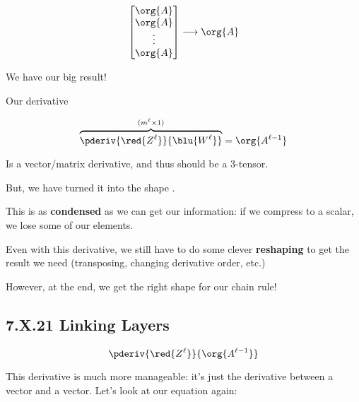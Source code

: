         \begin{equation}
            \begin{bmatrix}
                \org{A} \\ \org{A} \\ \vdots \\ \org{A} 
            \end{bmatrix}
            \longrightarrow
            \org{A}
        \end{equation}
        
        We have our big result!\\
        
        \begin{notation}
            Our derivative
            
            \begin{equation*}
                \overbrace{
                    \pderiv {\red{Z^\ell}}   { \blu{W^{\ell}} } 
                }^{ (m^{\ell} \times 1) }
                = 
                \org{A^{\ell-1}}
            \end{equation*}
        
            Is a vector/matrix derivative, and thus should be a 3-tensor.
            
            But, we have turned it into the shape .
        \end{notation}
        
        This is as \textbf{condensed} as we can get our information: if we compress to a scalar, we lose some of our elements.
        
        Even with this derivative, we still have to do some clever \textbf{reshaping} to get the result we need (transposing, changing derivative order, etc.)
        
        However, at the end, we get the right shape for our chain rule!
        
    \secdiv
            
    \subsection*{7.X.21 \quad Linking Layers}
                
        \begin{equation}
            \pderiv{\red{Z^\ell}} {\org{A^{\ell-1}}}
        \end{equation}
        
        This derivative is much more manageable: it's just the derivative between a vector and a vector. Let's look at our equation again:
        
